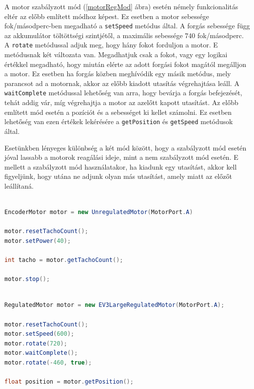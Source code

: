 A motor szabályzott mód (\ref{motorRegMod} ábra) esetén némely funkcionalitás eltér az előbb említett módhoz képest. Ez esetben a motor sebessége fok/másodperc-ben megadható a \texttt{setSpeed} metódus által. A forgás sebessége függ az akkumulátor töltöttségi szintjétől, a maximális sebessége 740 fok/másodperc. A \texttt{rotate} metódussal adjuk meg, hogy hány fokot forduljon a motor. E metódusnak két változata van. Megadhatjuk csak a fokot, vagy egy logikai értékkel megadható, hogy miután elérte az adott forgási fokot magától megálljon a motor. Ez esetben ha forgás közben meghívódik egy másik metódus, mely parancsot ad a motornak, akkor az előbb kiadott utasítás végrehajtása leáll. A \texttt{waitComplete} metódussal lehetőség van arra, hogy bevárja a forgás befejezését, tehát addig vár, míg végrehajtja a motor az azelőtt kapott utasítást. Az előbb említett mód esetén a pozíciót és a sebességet ki kellet számolni. Ez esetben lehetőség van ezen értékek lekérésére a \texttt{getPosition} és \texttt{getSpeed} metódusok által.

Esetünkben lényeges különbség a két mód között, hogy a szabályzott mód esetén jóval lassabb a motorok reagálási ideje, mint a nem szabályzott mód esetén. E mellett a szabályzott mód használatakor, ha kiadunk egy utasítást, akkor kell figyeljünk, hogy utána ne adjunk olyan más utasítást, amely miatt az előzőt leállítaná.

\begin{lstlisting}[label=motorUnregMod, caption=  A nagy motor \texttt{unregulated} mód használata, language=Java]

EncoderMotor motor = new UnregulatedMotor(MotorPort.A)

motor.resetTachoCount();
motor.setPower(40);

int tacho = motor.getTachoCount();

motor.stop();

\end{lstlisting}

\begin{lstlisting}[label=motorRegMod, caption= A nagy motor \texttt{regulated} mód használata, language=Java]

RegulatedMotor motor = new EV3LargeRegulatedMotor(MotorPort.A);

motor.resetTachoCount();
motor.setSpeed(600);
motor.rotate(720);
motor.waitComplete();
motor.rotate(-460, true);

float position = motor.getPosition();

\end{lstlisting}

